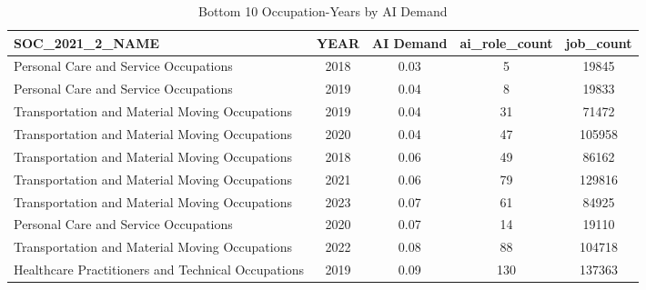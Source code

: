 \begin{table}[htbp]
\caption{Bottom 10 Occupation-Years by AI Demand}
\label{tab:bottom_occ_years}
\begin{tabular}{lcccc}
\hline\hline
SOC\_2021\_2\_NAME & YEAR & AI Demand & ai\_role\_count & job\_count \\
\hline
Personal Care and Service Occupations & 2018 & 0.03 & 5 & 19845 \\
Personal Care and Service Occupations & 2019 & 0.04 & 8 & 19833 \\
Transportation and Material Moving Occupations & 2019 & 0.04 & 31 & 71472 \\
Transportation and Material Moving Occupations & 2020 & 0.04 & 47 & 105958 \\
Transportation and Material Moving Occupations & 2018 & 0.06 & 49 & 86162 \\
Transportation and Material Moving Occupations & 2021 & 0.06 & 79 & 129816 \\
Transportation and Material Moving Occupations & 2023 & 0.07 & 61 & 84925 \\
Personal Care and Service Occupations & 2020 & 0.07 & 14 & 19110 \\
Transportation and Material Moving Occupations & 2022 & 0.08 & 88 & 104718 \\
Healthcare Practitioners and Technical Occupations & 2019 & 0.09 & 130 & 137363 \\
\hline\hline
\end{tabular}
\end{table}
